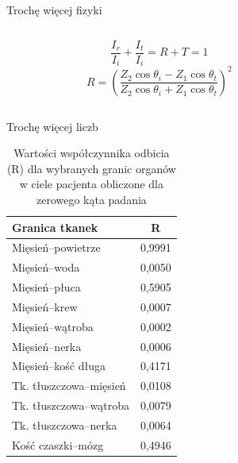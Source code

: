 \documentclass[aspectratio=43]{beamer}
\begin{document}
\begin{frame}{Trochę więcej fizyki}{}
    \begin{columns}
    \begin{figure}
    
    \end{figure}
    \[\frac{I_r}{I_i}+\frac{I_t}{I_i}=R+T=1\]
    \[R=\left(\frac{Z_2 \cos\theta_i-Z_1 \cos\theta_t}{Z_2 \cos\theta_i+Z_1\cos\theta_t}\right)^2\]
\end{columns}
\end{frame}

\begin{frame}{Trochę więcej liczb}{}
    \begin{table}[h]
\centering
\caption{Wartości współczynnika odbicia (R) dla wybranych granic organów w ciele pacjenta obliczone dla zerowego kąta padania}
\label{tab:odbicie}
\begin{tabular}{|l|c|}
\hline
\textbf{Granica tkanek} & \textbf{R} \\ \hline
Mięsień–powietrze & 0,9991 \\ \hline
Mięsień–woda & 0,0050 \\ \hline
Mięsień–płuca & 0,5905 \\ \hline
Mięsień–krew & 0,0007 \\ \hline
Mięsień–wątroba & 0,0002 \\ \hline
Mięsień–nerka & 0,0006 \\ \hline
Mięsień–kość długa & 0,4171 \\ \hline
Tk. tłuszczowa–mięsień & 0,0108 \\ \hline
Tk. tłuszczowa–wątroba & 0,0079 \\ \hline
Tk. tłuszczowa–nerka & 0,0064 \\ \hline
Kość czaszki–mózg & 0,4946 \\ \hline
\end{tabular}
\end{table}
\end{frame}
\end{document}

